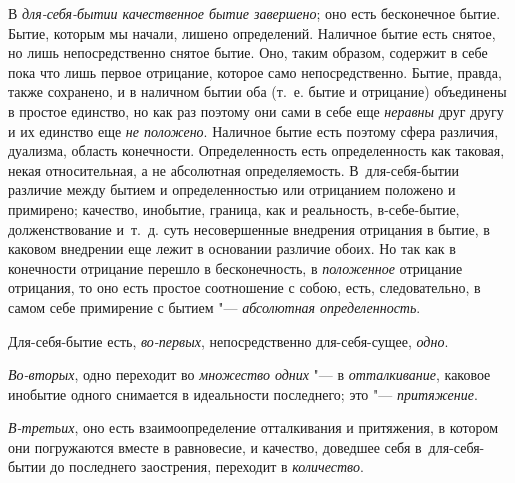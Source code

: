 В {\em для-себя-бытии качественное бытие завершено}; оно
есть бесконечное бытие. Бытие, которым мы начали, лишено определений.
Наличное бытие есть снятое, но лишь непосредственно снятое бытие. Оно,
таким образом, содержит в себе пока что лишь первое отрицание, которое само
непосредственно. Бытие, правда, также сохранено, и в наличном бытии оба
(т.~е. бытие и отрицание) объединены в простое единство, но как раз поэтому
они сами в себе еще {\em неравны} друг другу и их
единство еще {\em не положено}. Наличное бытие есть
поэтому сфера различия, дуализма, область конечности. Определенность
есть определенность как таковая, некая относительная, а не абсолютная
определяемость. В~для-себя-бытии различие между бытием и определенностью
или отрицанием положено и примирено; качество, инобытие, граница, как и
реальность, в-себе-бытие, долженствование и~т.~д. суть несовершенные
внедрения отрицания в бытие, в каковом внедрении еще лежит в основании
различие обоих. Но так как в конечности отрицание перешло в бесконечность,
в {\em положенное} отрицание отрицания, то оно есть
простое соотношение с собою, есть, следовательно, в самом себе примирение с
бытием "--- {\em абсолютная определенность}.

Для-себя-бытие есть, {\em во-первых}, непосредственно
для-себя-сущее, {\em одно}.

{\em Во-вторых}, одно переходит во {\em множество одних} "--- в
{\em отталкивание}, каковое инобытие одного снимается в
идеальности последнего; это "--- {\em притяжение}.

{\em В-третьих}, оно есть взаимоопределение отталкивания и притяжения,
в котором они погружаются вместе в равновесие, и качество, доведшее себя
в~для-себя-бытии до последнего заострения, переходит в {\em количество}.

